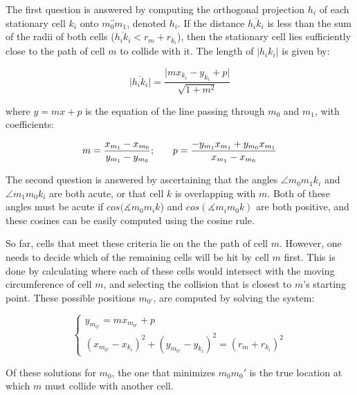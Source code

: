 \documentclass[12pt]{article}
\begin{document}
The first question is answered by computing the orthogonal projection \(h_i\) of 
each stationary cell \(k_i\) onto \(\overleftrightarrow{m_0m_1}\), denoted 
\(h_i\). If the distance \(\overline{h_ik_i}\) is less than the sum of the 
radii of both cells (\(\overline{h_ik_i} < r_m + r_{k_i}\)), then the 
stationary cell lies sufficiently close to the path of cell \(m\) to collide 
with it. The length of \(\lvert h_ik_i \rvert\) is given by:

\begin{equation}
\lvert\overline{h_ik_i}\rvert = \frac{\lvert {mx_{k_i} - y_{k_i} + p}\rvert }{\sqrt{1+m^2}}
\end{equation}

where \(y = mx + p\) is the equation of the line passing through \(m_0\)
and \(m_1\), with coefficients:

\begin{equation}
  m = \frac{x_{m_1}-x_{m_0}}{y_{m_1}-y_{m_0}}\text; \qquad p = \frac{-y_{m_1}x_{m_1}+y_{m_0}x_{m_1}}{x_{m_1}-x_{m_0}}
\end{equation}

The second question is answered by ascertaining that the angles \(\angle m_0m_1k_i\) 
and \(\angle m_1m_0k_i\) are both acute, or that 
cell \(k\) is overlapping with \(m\). Both of these angles 
must be acute if \(cos(\measuredangle m_0m_ik\)) and \(cos(\measuredangle m_im_0k)\) are 
both positive, and these cosines can be easily computed 
using the cosine rule.

So far, cells that meet these criteria lie on the the path of cell 
\(m\). However, one needs to decide which of the remaining cells
will be hit by cell \(m\) first. This is done by 
calculating where each of these cells would intersect with the moving 
circumference of cell \(m\), and selecting the collision that is closest to 
\(m\)'s starting point. These possible positions \(m_{0'}\), 
are computed by solving the system:

\begin{equation}
  \begin{cases} 
    y_{m_{0'}} = mx_{m_{0'}} + p \\
    (x_{m_{0'}} - x_{k_i})^2 + (y_{m_{0'}}-y_{k_i})^2 =  (r_m+r_{k_i})^2
  \end{cases}
\end{equation}

Of these solutions for \(m_0\), the one that minimizes \(m_0m_0'\) 
is the true location at which \(m\) must collide with another 
cell. 
\end{document}
